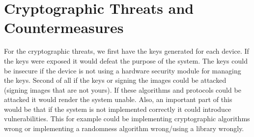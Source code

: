 \documentclass[9pt]{extarticle}
\begin{document}
\section{Cryptographic Threats and Countermeasures}
For the cryptographic threats, we first have the keys generated for each device. If the keys were exposed it would defeat the purpose of the system. The keys could be insecure if the device is not using a hardware security module for managing the keys. Second of all if the keys or signing the images could be attacked (signing images that are not yours). If these algorithms and protocols could be attacked it would render the system unable. Also, an important part of this would be that if the system is not implemented correctly it could introduce vulnerabilities. This for example could be implementing cryptographic algorithms wrong or implementing a randomness algorithm wrong/using a library wrongly.

\printbibliography
\end{document}
